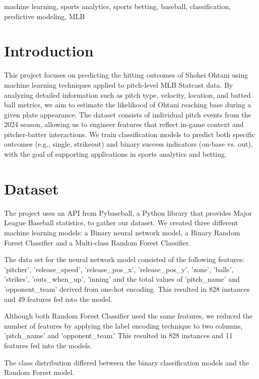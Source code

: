 \documentclass[conference]{IEEEtran}
\begin{document}
\vspace{10pt}

\begin{IEEEkeywords}
machine learning, sports analytics, sports betting, baseball, classification, predictive modeling, MLB
\end{IEEEkeywords}

\section{Introduction}
This project focuses on predicting the hitting outcomes of Shohei Ohtani using machine learning techniques applied to pitch-level MLB Statcast data. By analyzing detailed information such as pitch type, velocity, location, and batted ball metrics, we aim to estimate the likelihood of Ohtani reaching base during a given plate appearance. The dataset consists of individual pitch events from the 2024 season, allowing us to engineer features that reflect in-game context and pitcher-batter interactions. We train classification models to predict both specific outcomes (e.g., single, strikeout) and binary success indicators (on-base vs. out), with the goal of supporting applications in sports analytics and betting.

\section{Dataset}
The project uses an API from Pybaseball, a Python library that provides Major League Baseball statistics, to gather our dataset. We created three different machine learning models: a Binary neural network model, a Binary Random Forest Classifier and a Multi-class Random Forest Classifier. 

The data set for the neural network model consisted of the following features: 'pitcher', 'release\_speed', 'release\_pos\_x', 'release\_pos\_y', 'zone', 'balls', 'strikes', 'outs\_when\_up', 'inning' and the total values of 'pitch\_name' and 'opponent\_team' derived from one-hot encoding. This resulted in 828 instances and 49 features fed into the model.

Although both Random Forest Classifier used the same features, we reduced the number of features by applying the label encoding technique to two columns, 'pitch\_name' and 'opponent\_team.' This resulted in 828 instances and 11 features fed into the models.

The class distribution differed between the binary classification models and the Random Forest model.
\end{document}
